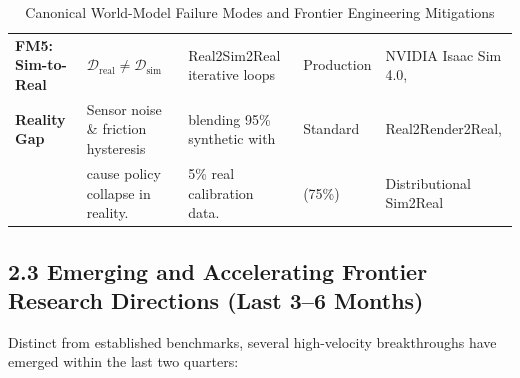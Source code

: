 \documentclass[11pt,a4paper]{article}
\begin{document}
\begin{table}[h!]
\begin{tabularx}{\textwidth}{@{}l p{3.8cm} p{4.2cm} l X@{}}
\addlinespace
\textbf{FM5: Sim-to-Real} & $\mathcal{D}_{\text{real}} \neq \mathcal{D}_{\text{sim}}$ & Real2Sim2Real iterative loops & Production & NVIDIA Isaac Sim 4.0, \\
\textbf{Reality Gap} & Sensor noise \& friction hysteresis & blending 95\% synthetic with & Standard & Real2Render2Real, \\
& cause policy collapse in reality. & 5\% real calibration data. & (75\%) & Distributional Sim2Real \\
\bottomrule
\end{tabularx}
\caption{Canonical World-Model Failure Modes and Frontier Engineering Mitigations}
\end{table}

\subsection{2.3 Emerging and Accelerating Frontier Research Directions (Last 3--6 Months)}
Distinct from established benchmarks, several high-velocity breakthroughs have emerged within the last two quarters:
\end{document}

